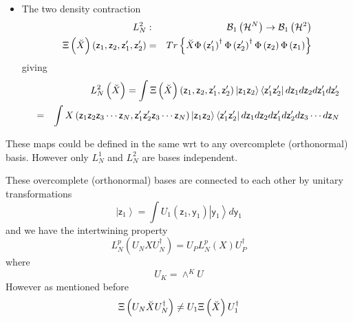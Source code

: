\documentclass[aps,preprint]{revtex4}
\begin{document}
\begin{description}
\begin{itemize}
\item The two density contraction%
\begin{eqnarray}
L_{N}^{2} &:&\mathcal{B}_{1}\left( \mathcal{H}^{N}\right) \rightarrow 
\mathcal{B}_{1}\left( \mathcal{H}^{2}\right)  \notag \\
\Xi \left( \breve{X}\right) \left( \mathsf{z}_{1},\mathsf{z}_{2},\mathsf{z}%
_{1}^{\prime },\mathsf{z}_{2}^{\prime }\right) &=&Tr\left\{ \breve{X}\Phi
\left( \mathsf{z}_{1}^{\prime }\right) ^{\dagger }\Phi \left( \mathsf{z}%
_{2}^{\prime }\right) ^{\dagger }\Phi \left( \mathsf{z}_{2}\right) \Phi
\left( \mathsf{z}_{1}\right) \right\}  \label{d2}
\end{eqnarray}%
giving 
\begin{eqnarray}
&&L_{N}^{2}\left( \breve{X}\right) =\int \Xi \left( \breve{X}\right) \left( 
\mathsf{z}_{1},\mathsf{z}_{2},\mathsf{z}_{1}^{\prime },\mathsf{z}%
_{2}^{\prime }\right) \left\vert \mathsf{z}_{1}\mathsf{z}_{2}\right\rangle
\left\langle \mathsf{z}_{1}^{\prime }\mathsf{z}_{2}^{\prime }\right\vert d%
\mathsf{z}_{1}d\mathsf{z}_{2}d\mathsf{z}_{1}^{\prime }d\mathsf{z}%
_{2}^{\prime }  \notag \\
&=&\int X\left( \mathsf{z}_{1}\mathsf{z}_{2}\mathsf{z}_{3}\cdots \mathsf{z}%
_{N},\mathsf{z}_{1}^{\prime }\mathsf{z}_{2}^{\prime }\mathsf{z}_{3}\cdots 
\mathsf{z}_{N}\right) \left\vert \mathsf{z}_{1}\mathsf{z}_{2}\right\rangle
\left\langle \mathsf{z}_{1}^{\prime }\mathsf{z}_{2}^{\prime }\right\vert d%
\mathsf{z}_{1}d\mathsf{z}_{2}d\mathsf{z}_{1}^{\prime }d\mathsf{z}%
_{2}^{\prime }d\mathsf{z}_{3}\cdots d\mathsf{z}_{N}
\end{eqnarray}
\end{itemize}

\item \qquad These maps could be defined in the same wrt to any overcomplete
(orthonormal) basis. However only $L_{N}^{1}$ and $L_{N}^{2}$ are bases
independent.
\end{description}

These overcomplete (orthonormal) bases are connected to each other by
unitary transformations 
\begin{equation}
\left\vert \mathsf{z}_{1}\right\rangle =\int U_{1}\left( \mathsf{z}_{1}%
\mathsf{,y}_{1}\right) \left\vert \mathsf{y}_{1}\right\rangle d\mathsf{y}_{1}
\end{equation}%
and we have the intertwining property 
\begin{equation}
L_{N}^{p}\left( U_{N}XU_{N}^{\dagger }\right) =U_{P}L_{N}^{p}\left( X\right)
U_{P}^{\dagger }
\end{equation}%
where 
\begin{equation}
U_{K}=\wedge ^{K}U
\end{equation}%
However as mentioned before 
\begin{equation}
\Xi \left( U_{N}\breve{X}U_{N}^{\dagger }\right) \neq U_{1}\Xi \left( \breve{%
X}\right) U_{1}^{\dagger }
\end{equation}
\end{document}
